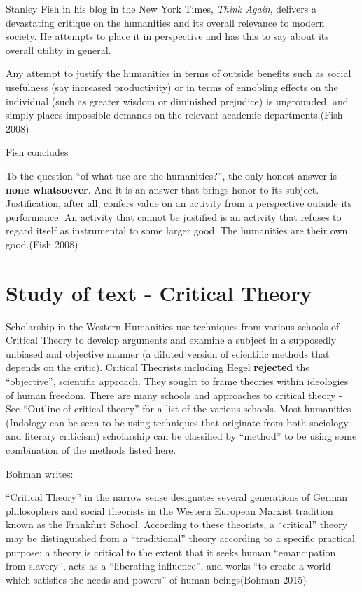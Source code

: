 Stanley Fish in his blog in the New York Times, {\sl Think Again}, delivers a devastating critique on the humanities and its overall relevance to modern society. He attempts to place it in perspective and has this to say about its overall utility in general. 
\begin{myquote}
Any attempt to justify the humanities in terms of outside benefits such as social usefulness (say increased productivity) or in terms of ennobling effects on the individual (such as greater wisdom or diminished prejudice) is ungrounded, and simply places impossible demands on the relevant academic departments.\hfill (Fish 2008)
\end{myquote}

Fish concludes
\begin{myquote}
To the question ``of what use are the humanities?'', the only honest answer is {\bf none whatsoever}. And it is an answer that brings honor to its subject. Justification, after all, confers value on an activity from a perspective outside its performance. An activity that cannot be justified is an activity that refuses to regard itself as instrumental to some larger good. The humanities are their own good.\hfill (Fish 2008)
\end{myquote}

\section*{Study of text - Critical Theory}

Scholarship in the Western Humanities use techniques from various schools of Critical Theory to develop arguments and examine a subject in a supposedly unbiased and objective manner (a diluted version of scientific methods that depends on the critic). Critical Theorists including Hegel {\bf rejected} the ``objective'', scientific approach. They sought to frame theories within ideologies of human freedom. There are many schools and approaches to critical theory - See ``Outline of critical theory'' for a list of the various schools. Most humanities (Indology can be seen to be using techniques that originate from both sociology and literary criticism) scholarship can be classified by ``method'' to be using some combination of the methods listed here.

Bohman writes:
\begin{myquote}
``Critical Theory'' in the narrow sense designates several generations of German philosophers and social theorists in the Western European Marxist tradition known as the Frankfurt School. According to these theorists, a ``critical'' theory may be distinguished from a ``traditional'' theory according to a specific practical purpose: a theory is critical to the extent that it seeks human ``emancipation from slavery'', acts as a ``liberating influence'', and works ``to create a world which satisfies the needs and powers'' of human beings\hfill (Bohman 2015)
\end{myquote}

